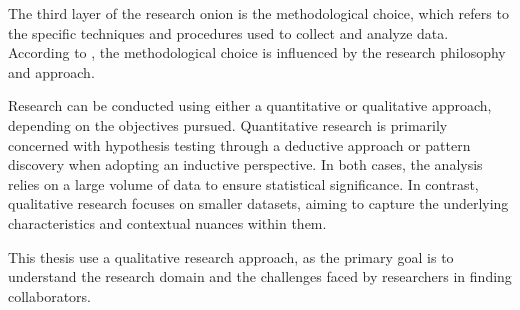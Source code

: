 The third layer of the research onion is the methodological choice, which refers to the specific techniques and procedures used to collect and analyze data.
According to \textcite{SaundersMark2023}, the methodological choice is influenced by the research philosophy and approach.

Research can be conducted using either a quantitative or qualitative approach, depending on the objectives pursued.
Quantitative research is primarily concerned with hypothesis testing through a deductive approach or pattern discovery when adopting an inductive perspective.
In both cases, the analysis relies on a large volume of data to ensure statistical significance.
In contrast, qualitative research focuses on smaller datasets, aiming to capture the underlying characteristics and contextual nuances within them.

This thesis use a qualitative research approach, as the primary goal is to understand the research domain and the challenges faced by researchers in finding collaborators.